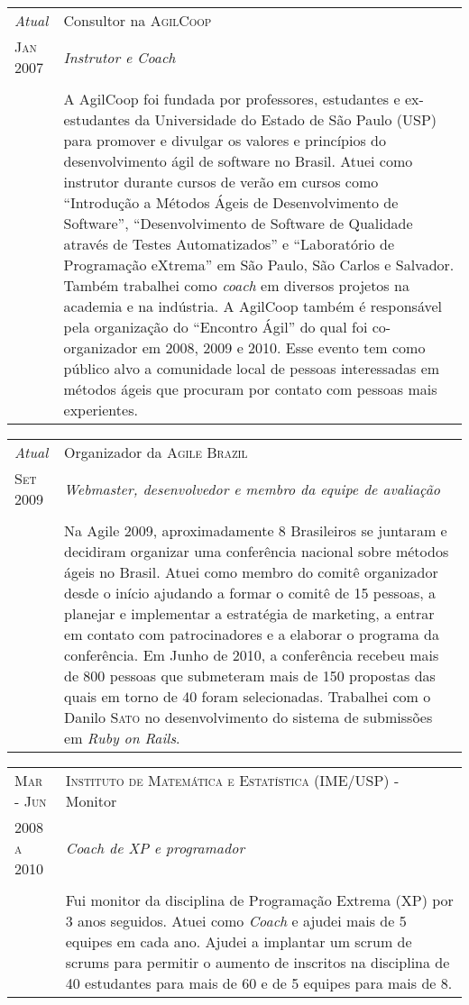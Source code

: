 \documentclass[letter,10pt]{article}
\begin{document}
\begin{tabular}{p{2.5cm}|p{13.5cm}}
  \emph{Atual} & Consultor na \textsc{AgilCoop}\\
  \textsc{Jan 2007}& \emph{Instrutor e Coach}\\
  &\\
  &A AgilCoop foi fundada por professores, estudantes e ex-estudantes
  da Universidade do Estado de São Paulo (USP) para promover e
  divulgar os valores e princípios do desenvolvimento ágil de software
  no Brasil. Atuei como instrutor durante cursos de verão em cursos
  como ``Introdução a Métodos Ágeis de Desenvolvimento de Software'',
  ``Desenvolvimento de Software de Qualidade através de Testes
  Automatizados'' e ``Laboratório de Programação eXtrema'' em São
  Paulo, São Carlos e Salvador.
  Também trabalhei como \textit{coach} em diversos projetos na
  academia e na indústria. A AgilCoop também é responsável pela
  organização do ``Encontro Ágil'' do qual foi co-organizador em 2008,
  2009 e 2010. Esse evento tem como público alvo a comunidade local de
  pessoas interessadas em métodos ágeis que procuram por contato com
  pessoas mais experientes.
\end{tabular}

\begin{tabular}{p{2.5cm}|p{13.5cm}}
  \emph{Atual} & Organizador da \textsc{Agile Brazil}\\
  \textsc{Set 2009}& \emph{Webmaster, desenvolvedor e membro da equipe
    de avaliação}\\
  &\\
  &Na Agile 2009, aproximadamente 8 Brasileiros se juntaram e
  decidiram organizar uma conferência nacional sobre métodos ágeis no
  Brasil. Atuei como membro do comitê organizador desde o início
  ajudando a formar o comitê de 15 pessoas, a planejar e implementar a
  estratégia de marketing, a entrar em contato com patrocinadores e a
  elaborar o programa da conferência. Em Junho de 2010, a conferência
  recebeu mais de 800 pessoas que submeteram mais de 150 propostas das
  quais em torno de 40 foram selecionadas. Trabalhei com o Danilo
  \textsc{Sato} no desenvolvimento do sistema de submissões em
  \textit{Ruby on Rails}.
\end{tabular}

\begin{tabular}{p{2.5cm}|p{13.5cm}}
  \textsc{Mar - Jun} & \textsc{Instituto de Matemática e Estatística
    (IME/USP)} - Monitor\\
  \textsc{2008 a 2010}& \emph{Coach de XP e programador}\\
  &\\
  & Fui monitor da disciplina de Programação Extrema (XP) por 3 anos
  seguidos. Atuei como \textit{Coach} e ajudei mais de 5 equipes em
  cada ano. Ajudei a implantar um scrum de scrums para permitir o
  aumento de inscritos na disciplina de 40 estudantes para mais de 60
  e de 5 equipes para mais de 8.
\end{tabular}
\end{document}
